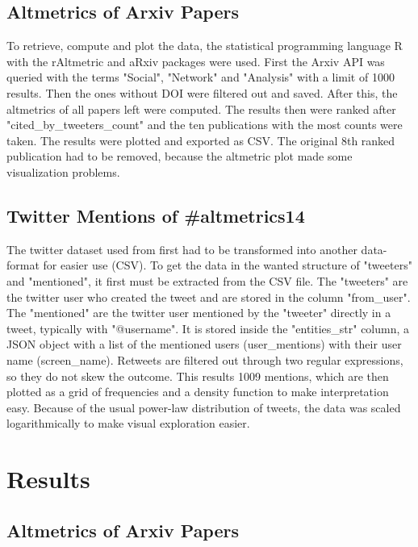 \documentclass[fleqn,10pt,lineno]{wlpeerj} %
\begin{document}
\subsection*{Altmetrics of Arxiv Papers}
To retrieve, compute and plot the data, the statistical programming language R with the rAltmetric and aRxiv packages were used. First the Arxiv API was queried with the terms "Social", "Network" and "Analysis" with a limit of 1000 results. Then the ones without DOI were filtered out and saved. After this, the altmetrics of all papers left were computed. The results then were ranked after "cited\_by\_tweeters\_count" and the ten publications with the most counts were taken. The results were plotted and exported as CSV. The original 8th ranked publication had to be removed, because the altmetric plot made some visualization problems.

\subsection*{Twitter Mentions of \#altmetrics14}
The twitter dataset used from \cite{ernesto_altmetrics14_2014} first had to be transformed into another data-format for easier use (CSV). To get the data in the wanted structure of "tweeters" and "mentioned", it first must be extracted from the CSV file. The "tweeters" are the twitter user who created the tweet and are stored in the column "from\_user". The "mentioned" are the twitter user mentioned by the "tweeter" directly in a tweet, typically with "@username". It is stored inside the "entities\_str" column, a JSON object with a list of the mentioned users (user\_mentions) with their user name (screen\_name). Retweets are filtered out through two regular expressions, so they do not skew the outcome. This results 1009 mentions, which are then plotted as a grid of frequencies \citep{tweets_tutorial} and a density function to make interpretation easy. Because of the usual power-law distribution of tweets\citep{Moriano2014}, the data was scaled logarithmically to make visual exploration easier.

\section*{Results}

\subsection*{Altmetrics of Arxiv Papers}
\end{document}
